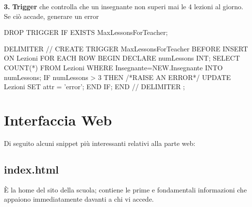 \documentclass{article}
\begin{document}
\bigskip

\begin{flushleft}
\textbf{3.} \textbf{Trigger} che controlla che un insegnante non superi mai le 4 lezioni al giorno. Se ciò accade, generare un error
\end{flushleft}

\begin{sql}
DROP TRIGGER IF EXISTS MaxLessonsForTeacher;

DELIMITER //
CREATE TRIGGER MaxLessonsForTeacher
BEFORE INSERT ON Lezioni
FOR EACH ROW
BEGIN
	DECLARE numLessons INT;
	SELECT COUNT(*)
	FROM Lezioni
	WHERE Insegnante=NEW.Insegnante
	INTO numLessons;
	IF numLessons > 3  THEN
	/*RAISE AN ERROR*/	
		UPDATE Lezioni SET attr = 'error';
	END IF; 
END //
DELIMITER ;
\end{sql}

\bigskip

\section{Interfaccia Web}

Di seguito alcuni snippet più interessanti relativi alla parte web:

\subsection{index.html}

È la home del sito della scuola; contiene le prime e fondamentali informazioni che appaiono immediatamente davanti a chi vi accede.

\bigskip
\end{document}
